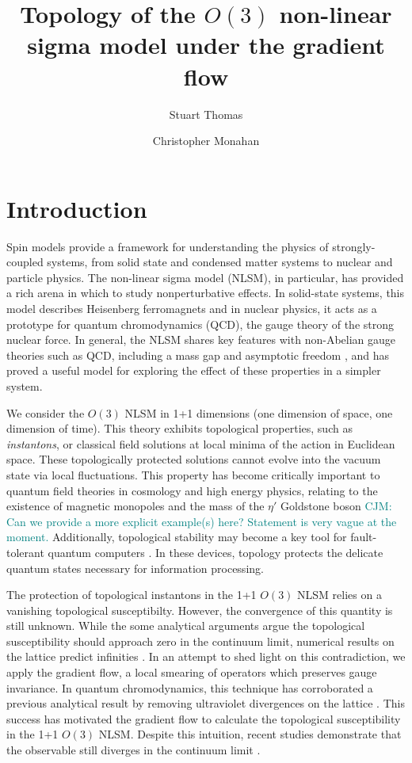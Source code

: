 \documentclass[a4paper,11pt]{article}
\title{Topology of the $O(3)$ non-linear sigma model under the gradient flow}
\author*[a]{Stuart Thomas}
\author[a,b]{Christopher Monahan}
\affiliation[a]{Department of Physics, William \& Mary, \\ 300 Ukrop Way, Williamsburg, VA, USA} %
\affiliation[b]{Thomas Jefferson National Accelerator Facility, \\ 12000 Jefferson Avenue, Newport News, VA, USA} %
\newcommand\chris[1]{\textcolor{teal}{CJM: #1}}
\begin{document}
\maketitle

\section{Introduction}
\label{sec:introduction}
Spin models provide a framework for understanding the physics of strongly-coupled systems, from solid state and condensed matter systems to nuclear and particle physics. The non-linear sigma model (NLSM), in particular, has provided a rich arena in which to study nonperturbative effects. In solid-state systems, this model describes Heisenberg ferromagnets \cite{callan1985} and in nuclear physics, it acts as a prototype for quantum chromodynamics (QCD), the gauge theory of the strong nuclear force. In general, the NLSM shares key features with non-Abelian gauge theories such as QCD, including a mass gap and asymptotic freedom \cite{polyakov1975}, and has proved a useful model for exploring the effect of these properties in a simpler system.

We consider the $O(3)$ NLSM in 1+1 dimensions (one dimension of space, one dimension of time). This theory exhibits topological properties, such as \textit{instantons}, or classical field solutions at local minima of the action in Euclidean space. These topologically protected solutions cannot evolve into the vacuum state via local fluctuations. This property has become critically important to quantum field theories in cosmology and high energy physics, relating to the existence of magnetic monopoles\cite{goddard1986} and the mass of the $\eta'$ Goldstone boson \cite{witten1979, veneziano1979} \chris{Can we provide a more explicit example(s) here? Statement is very vague at the moment.} Additionally, topological stability may become a key tool for fault-tolerant quantum computers \cite{kitaev1997}. In these devices, topology protects the delicate quantum states necessary for information processing.

The protection of topological instantons in the 1+1 $O(3)$ NLSM relies on a vanishing topological susceptibilty. However, the convergence of this quantity is still unknown. \cite{bietenholz2018} While the some analytical arguments argue the topological susceptibility should approach zero in the continuum limit, numerical results on the lattice predict infinities \cite{berg1981}. In an attempt to shed light on this contradiction, we apply the gradient flow, a local smearing of operators which preserves gauge invariance. In quantum chromodynamics, this technique has corroborated a previous analytical result \cite{giusti2004} by removing ultraviolet divergences on the lattice \cite{bruno2014}. This success has motivated the gradient flow to calculate the topological susceptibility in the 1+1 $O(3)$ NLSM. Despite this intuition, recent studies demonstrate that the observable still diverges in the continuum limit \cite{bietenholz2018}.
\end{document}
